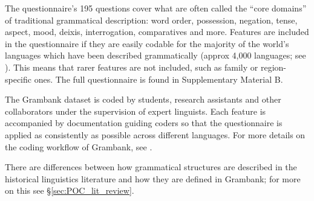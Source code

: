 \documentclass[12pt,letterpaper]{article}
\begin{document}


The questionnaire's 195 questions cover what are often called the ``core domains'' of traditional grammatical description: word order, possession, negation, tense, aspect, mood, deixis, interrogation, comparatives and more. Features are included in the questionnaire if they are easily codable for the majority of the world's languages which have been described grammatically (approx 4,000 languages; see \citealt{hammarstrom2018simultaneous}). This means that rarer features are not included, such as family or region-specific ones. The full questionnaire is found in Supplementary Material B.

The Grambank dataset is coded by students, research assistants and other collaborators under the supervision of expert linguists. Each feature is accompanied by documentation guiding coders so that the questionnaire is applied as consistently as possible across different languages. For more details on the coding workflow of Grambank, see \citet{slingerland2020coding}. %

There are differences between how grammatical structures are described in the historical linguistics literature and how they are defined in Grambank; for more on this see §\ref{sec:POC_lit_review}.

\end{document}
